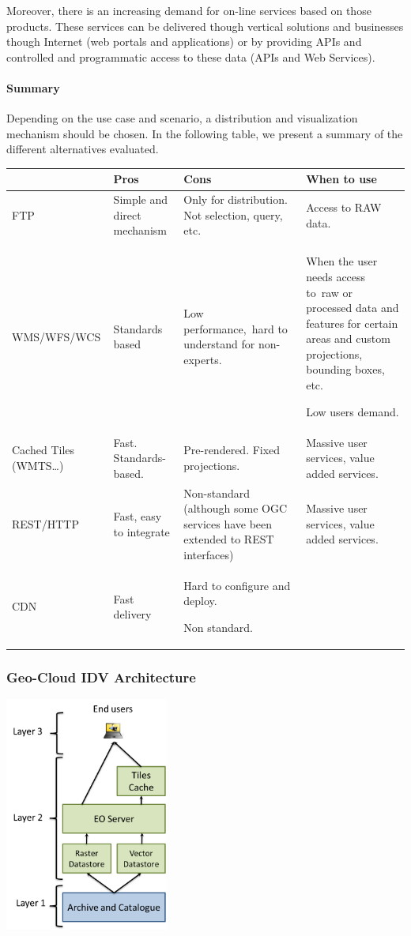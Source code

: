 \documentclass[a4paper]{article}
\begin{document}
Moreover, there is an increasing demand for on-line services based on
those products. These services can be delivered though vertical
solutions and businesses though Internet (web portals and applications)
or by providing APIs and controlled and programmatic access to these
data (APIs and Web Services).\ 

\paragraph[Summary]{Summary}
Depending on the use case and scenario, a distribution and visualization
mechanism should be chosen. In the following table, we present a
summary of the different alternatives evaluated.

\begin{center}
\tablehead{}
\begin{supertabular}{|m{1.2003598in}|m{1.2003598in}|m{1.2003598in}|m{1.2003598in}|}
\hline
~
 &
Pros &
Cons &
When to use\\\hline
FTP &
Simple and direct mechanism &
Only for distribution. Not selection, query, etc. &
Access to RAW data.\\\hline
WMS/WFS/WCS &
Standards based &
Low performance,\ hard to understand for non-experts. &
When the user needs access to\ raw or processed data and features for
certain areas and custom projections, bounding boxes, etc.

Low users demand.\\\hline
Cached Tiles (WMTS{\dots}) &
Fast. Standards-based. &
Pre-rendered. Fixed projections.\  &
Massive user services, value added services.\\\hline
REST/HTTP &
Fast, easy to integrate &
Non-standard (although some OGC services have been extended to REST
interfaces) &
Massive user services, value added services.\\\hline
CDN &
Fast delivery &
Hard to configure and deploy.

Non standard. &
~
\\\hline
\end{supertabular}
\end{center}
\subsubsection[Geo{}-Cloud IDV Architecture]{Geo-Cloud IDV Architecture}
\hypertarget{Toc381777207}{}{\centering 
\includegraphics[width=2.11941in,height=3.04301in]{out-img26.png} \par}
\end{document}
